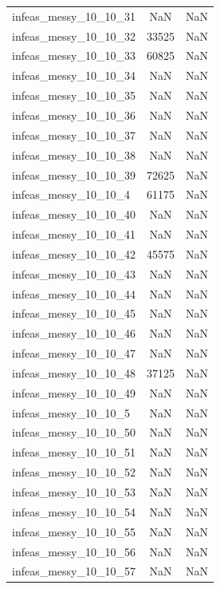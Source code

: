 \begin{longtable}{lcc}
infeas\_messy\_10\_10\_31  &      NaN &    NaN \\
infeas\_messy\_10\_10\_32  &    33525 &    NaN \\
infeas\_messy\_10\_10\_33  &    60825 &    NaN \\
infeas\_messy\_10\_10\_34  &      NaN &    NaN \\
infeas\_messy\_10\_10\_35  &      NaN &    NaN \\
infeas\_messy\_10\_10\_36  &      NaN &    NaN \\
infeas\_messy\_10\_10\_37  &      NaN &    NaN \\
infeas\_messy\_10\_10\_38  &      NaN &    NaN \\
infeas\_messy\_10\_10\_39  &    72625 &    NaN \\
infeas\_messy\_10\_10\_4   &    61175 &    NaN \\
infeas\_messy\_10\_10\_40  &      NaN &    NaN \\
infeas\_messy\_10\_10\_41  &      NaN &    NaN \\
infeas\_messy\_10\_10\_42  &    45575 &    NaN \\
infeas\_messy\_10\_10\_43  &      NaN &    NaN \\
infeas\_messy\_10\_10\_44  &      NaN &    NaN \\
infeas\_messy\_10\_10\_45  &      NaN &    NaN \\
infeas\_messy\_10\_10\_46  &      NaN &    NaN \\
infeas\_messy\_10\_10\_47  &      NaN &    NaN \\
infeas\_messy\_10\_10\_48  &    37125 &    NaN \\
infeas\_messy\_10\_10\_49  &      NaN &    NaN \\
infeas\_messy\_10\_10\_5   &      NaN &    NaN \\
infeas\_messy\_10\_10\_50  &      NaN &    NaN \\
infeas\_messy\_10\_10\_51  &      NaN &    NaN \\
infeas\_messy\_10\_10\_52  &      NaN &    NaN \\
infeas\_messy\_10\_10\_53  &      NaN &    NaN \\
infeas\_messy\_10\_10\_54  &      NaN &    NaN \\
infeas\_messy\_10\_10\_55  &      NaN &    NaN \\
infeas\_messy\_10\_10\_56  &      NaN &    NaN \\
infeas\_messy\_10\_10\_57  &      NaN &    NaN \\

\end{longtable}
